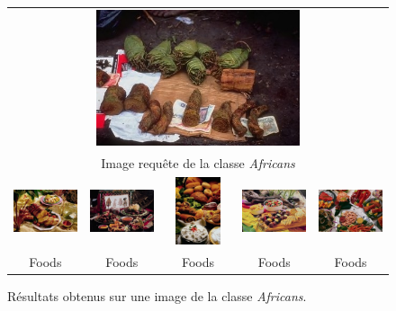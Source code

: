 \begin{figure}[H]
\begin{tabular}{ccccc}\\


\multicolumn{5}{c}{\includegraphics[width=6cm]{Figures/africans/0.jpg}}\\
\multicolumn{5}{c}{Image requête de la classe \textit{Africans}}\\


\includegraphics[width=3cm]{Figures/africans/1.jpg}
&
\includegraphics[width=3cm]{Figures/africans/2.jpg}
&
\includegraphics[height=2cm,width=3cm]{Figures/africans/3.jpg}
&
\includegraphics[width=3cm]{Figures/africans/4.jpg}
&
\includegraphics[width=3cm]{Figures/africans/5.jpg}\\
Foods & Foods & Foods & Foods & Foods\\

\end{tabular}
\caption[comp7]{Résultats obtenus sur une image de la classe \textit{Africans}.}
\end{figure}

